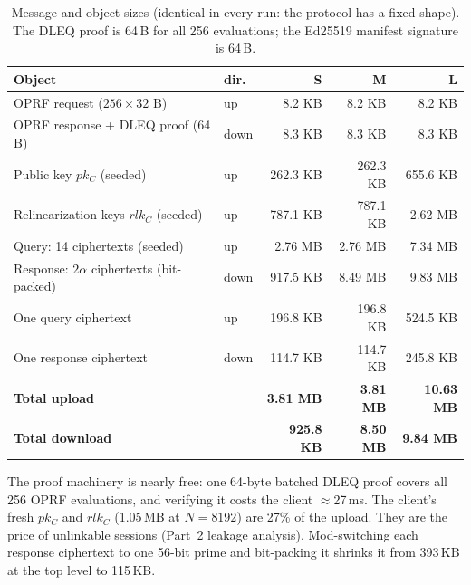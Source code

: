 \documentclass[11pt]{article}
\begin{document}
\begin{table}[H]
\centering\small
\caption{Message and object sizes (identical in every run: the protocol has a fixed shape). The DLEQ proof is 64\,B for all 256 evaluations; the Ed25519 manifest signature is 64\,B.}
\label{tab:size}
\begin{tabular}{@{}llrrr@{}}
\toprule
Object & dir. & S & M & L \\
\midrule
OPRF request ($256\times32$ B) & up & 8.2 KB & 8.2 KB & 8.2 KB \\
OPRF response + DLEQ proof (64 B) & down & 8.3 KB & 8.3 KB & 8.3 KB \\
Public key $pk_C$ (seeded) & up & 262.3 KB & 262.3 KB & 655.6 KB \\
Relinearization keys $rlk_C$ (seeded) & up & 787.1 KB & 787.1 KB & 2.62 MB \\
Query: 14 ciphertexts (seeded) & up & 2.76 MB & 2.76 MB & 7.34 MB \\
Response: $2\alpha$ ciphertexts (bit-packed) & down & 917.5 KB & 8.49 MB & 9.83 MB \\
\midrule
One query ciphertext & up & 196.8 KB & 196.8 KB & 524.5 KB \\
One response ciphertext & down & 114.7 KB & 114.7 KB & 245.8 KB \\
\midrule
\textbf{Total upload} & & \textbf{3.81 MB} & \textbf{3.81 MB} & \textbf{10.63 MB} \\
\textbf{Total download} & & \textbf{925.8 KB} & \textbf{8.50 MB} & \textbf{9.84 MB} \\
\bottomrule
\end{tabular}
\end{table}
The proof machinery is nearly free: one 64-byte batched DLEQ proof covers all 256 OPRF evaluations, and verifying it costs the client $\approx$27\,ms. The client's fresh $pk_C$ and $rlk_C$ (1.05\,MB at $N=8192$) are 27\% of the upload. They are the price of unlinkable sessions (Part~2 leakage analysis). Mod-switching each response ciphertext to one 56-bit prime and bit-packing it shrinks it from 393\,KB at the top level to 115\,KB.
\end{document}

